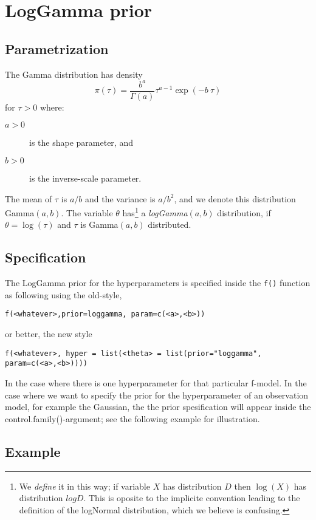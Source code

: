 \documentclass[a4paper,11pt]{article}
\begin{document}
\section*{LogGamma prior}

\subsection*{Parametrization}
The Gamma  distribution has density
\begin{equation}
    \pi(\tau)=\frac{b^a}{\Gamma(a)}\tau^{a-1}\exp(-b\ \tau)
\end{equation}
for $\tau>0$ where:
\begin{description}
\item[$a>0$] is the shape parameter, and
\item[$b>0$] is the inverse-scale parameter.
\end{description}
The mean of $\tau$ is $a/b$ and the variance is $a/b^2$, and we denote
this distribution  Gamma$(a,b)$.  The variable $\theta$
has\footnote{We \emph{define} it in this way; if variable $X$ has
    distribution $D$ then $\log(X)$ has distribution $logD$. This is
    oposite to the implicite convention leading to the definition of
    the logNormal distribution, which we believe is confusing.}  a
\emph{logGamma}$(a,b)$ distribution, if $\theta=\log(\tau)$ and $\tau$
is Gamma$(a,b)$ distributed.

\subsection*{Specification}
The LogGamma prior for the hyperparameters is specified inside the
{\tt f()} function as following using the old-style,
\begin{center}
    {\tt f(<whatever>,prior=loggamma, param=c(<a>,<b>))}
\end{center}
or better, the new style
\begin{center}
    {\tt f(<whatever>, hyper = list(<theta> =
        list(prior="loggamma", param=c(<a>,<b>))))}
\end{center}
In the case where there is one hyperparameter for that particular
f-model. In the case where we want to specify the prior for the
hyperparameter of an observation model, for example the
Gaussian, the the prior spesification will appear inside the
control.family()-argument; see the following example for illustration.

\subsection*{Example}
\end{document}
